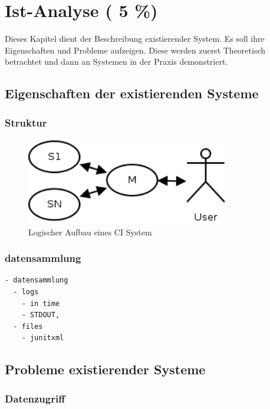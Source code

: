 \chapter{Ist-Analyse ( 5 \%)}
\label{chap:ist-analyse}

Dieses Kapitel dient der Beschreibung existierender System.
Es soll ihre Eigenschaften und Probleme aufzeigen.
Diese werden zuerst Theoretisch betrachtet und
dann an Systemen in der Praxis demonstriert.


\section{Eigenschaften der existierenden Systeme}

\subsection{Struktur}

\begin{figure}[ht]
  \label{fig:ist-aufbau-tradition}
  \begin{center}
      \includegraphics[height=1.5in]{imageinput/ist-aufbau-tradition.png}
  \end{center}
  \caption{Logischer Aufbau eines CI System}
\end{figure}

\subsection{datensammlung}

\begin{verbatim}
- datensammlung
  - logs
    - in time
    - STDOUT,
  - files
    - junitxml
\end{verbatim}

\section{Probleme existierender Systeme}


\subsection{Datenzugriff}


